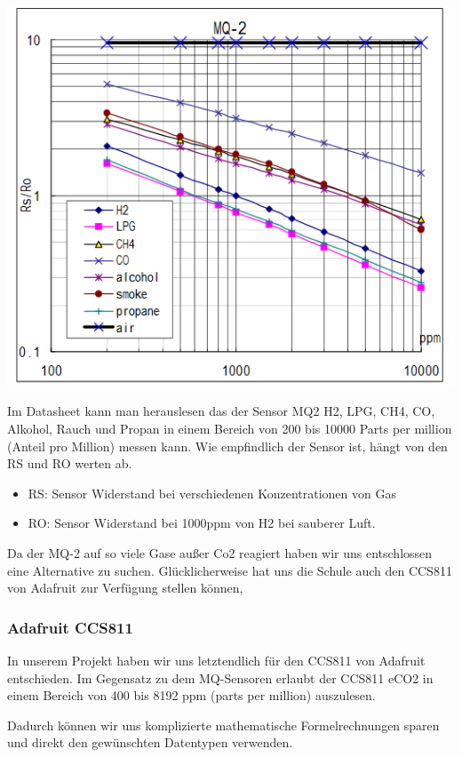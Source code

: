 {\includegraphics[width=0.8\linewidth]{figures/DatasheetMQ2.png}}{\cite{MQ_Datasheet}}

\cite{MQ_Sensoren}
\newline 

Im Datasheet \cite{MQ_Datasheet} kann man herauslesen das der Sensor MQ2 \cite{MQ_Sensoren} H2, LPG, CH4, CO, Alkohol, Rauch und Propan in einem Bereich von 200 bis 10000 Parts per million (Anteil pro Million) messen kann. Wie empfindlich der Sensor ist, hängt von den RS und RO werten ab.

\begin{itemize}
	\item RS: Sensor Widerstand bei verschiedenen Konzentrationen von Gas
	\item RO: Sensor Widerstand bei 1000ppm von H2 bei sauberer Luft.
\end{itemize}

Da der MQ-2  auf so viele Gase außer Co2 reagiert haben wir uns entschlossen eine Alternative zu suchen. Glücklicherweise hat uns die Schule auch den CCS811 von Adafruit zur Verfügung stellen können,

\subsubsection{Adafruit CCS811}

In unserem Projekt haben wir uns letztendlich für den CCS811 von Adafruit entschieden. Im Gegensatz zu dem MQ-Sensoren erlaubt der CCS811 eCO2 in einem Bereich von 400 bis 8192 ppm (parts per million) auszulesen. 
\cite{CCS811man}

Dadurch können wir uns komplizierte mathematische Formelrechnungen sparen und direkt den gewünschten Datentypen verwenden.

